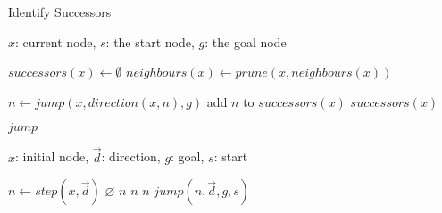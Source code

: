 \begin{algorithm}[b]
\caption{Identify Successors}
\label{alg:successors}
\begin{algorithmic}[1]
\REQUIRE $x$: current node, $s$: the start node, $g$: the goal node

\STATE $successors(x) \leftarrow \emptyset$
\STATE $neighbours(x) \leftarrow prune(x, neighbours(x))$ 

\STATE $n \leftarrow jump(x, direction(x, n), g)$
\STATE add $n$ to $successors(x)$
\ENDFOR
\RETURN $successors(x)$

\end{algorithmic}
\end{algorithm}

\begin{algorithm}[b]
\caption{$jump$}
\label{alg:jump}
\begin{algorithmic}[1]
\REQUIRE $x$: initial node, $\vec{d}$: direction, $g$: goal, $s$: start

\STATE $n \leftarrow step(x, \vec{d})$
	\RETURN $\varnothing$
\ENDIF
{}
	\RETURN $n$
\ENDIF
{}
	\RETURN $n$
\ENDIF
{}
			\RETURN $n$
		\ENDIF
	\ENDFOR
\ENDIF
\RETURN $jump(n, \vec{d}, g, s)$
\end{algorithmic}
\end{algorithm}
